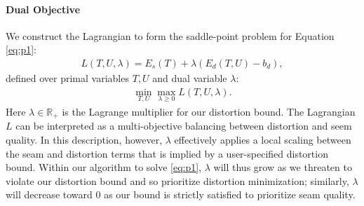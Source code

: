 
\paragraph{Dual Objective}
We construct the Lagrangian to form the saddle-point problem for Equation \ref{eq:p1}: %
\begin{align}
	L(T,U,\lambda) = E_s(T) + \lambda(E_d(T,U) - b_d),
	\label{eq:L}
\end{align}
%
defined over primal variables $T,U$ and dual variable $\lambda$:
%
\begin{align}
	\min_{T,U} \max_{\lambda\geq0} L(T,U,\lambda).
	\label{eq:p2}
\end{align}
%
Here $\lambda \in \mathbb{R_+}$ is the Lagrange multiplier for our distortion bound. The Lagrangian $L$ can be interpreted as a multi-objective balancing between distortion and seem quality. In this description, however, $\lambda$ effectively applies a local scaling between the seam and distortion terms that is implied %
by a user-specified distortion bound. Within our algorithm to solve \eqref{eq:p1}, $\lambda$ will thus grow as we threaten to violate our distortion bound and so prioritize distortion minimization; similarly, $\lambda$ will decrease toward $0$ as our bound is strictly satisfied to prioritize seam quality.


